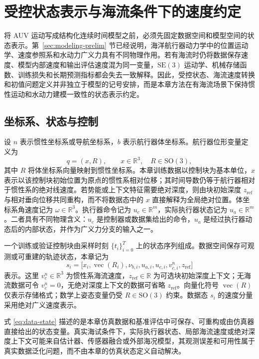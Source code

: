 \documentclass[UTF8,zihao=-4]{ctexrep}
\newcommand{\R}{\mathbb{R}}
\newcommand{\SO}{\mathrm{SO}}
\newcommand{\SE}{\mathrm{SE}}
\begin{document}
\section{受控状态表示与海流条件下的速度约定}
\label{sec:state-current-contract}

将 AUV 运动写成结构化连续时间模型之前，必须先固定数据空间和模型空间的状态表示。第~\ref{sec:modeling-prelim} 节已经说明，海洋航行器动力学中的位置运动学、速度参照系和水动力广义力具有不同物理作用。若有海流时仍将数据保存速度、模型内部速度和输出评估速度混为同一变量，\(\SE(3)\) 运动学、机械存储函数、训练损失和长期预测指标都会失去一致解释。因此，受控状态、海流速度转换和初值问题定义并非独立于模型的记号安排，而是本章方法在有海流场景下保持惯性运动和水动力建模一致性的状态表示约定。

\subsection{坐标系、状态与控制}

设 \(n\) 表示惯性坐标系或导航坐标系，\(b\) 表示航行器体坐标系。航行器位形变量定义为
\begin{equation}
  q=(x,R),\qquad x\in\R^3,\quad R\in\SO(3),
\end{equation}
其中 \(R\) 将体坐标系向量映射到惯性坐标系。本章训练数据以控制块为基本单位，\(x\) 表示以该控制块初始位置为原点的惯性系相对位移；其时间导数仍等于航行器相对于惯性系的绝对线速度。若势能或上下文特征需要绝对深度，则由块初始深度 \(z_{\mathrm{ref}}\) 与相对垂向位移共同重构，而不将数据态中的 \(x\) 直接解释为全局绝对位置。体坐标系角速度记为 \(\omega\in\R^3\)。执行器命令记为 \(u_c\in\R^m\)，实际执行器状态记为 \(u_a\in\R^m\)。二者具有不同物理含义：\(u_c\) 是控制器或数据集给出的命令，\(u_a\) 是经过执行器动态后的内部状态，并作为广义力分支的输入之一。

一个训练或验证控制块由采样时刻 \(\{t_i\}_{i=0}^{T}\) 上的状态序列组成。数据空间保存可观测或可重建的轨迹状态，本章记为
\begin{equation}
  s_i=
  \bigl[x_i,\operatorname{vec}(R_i),\nu_{b,i},u_{a,i},u_{c,i},v_{c,i}^n,z_{\mathrm{ref}}\bigr]
  \label{eq:data-state}
\end{equation}
表示。这里 \(v_c^n\in\R^3\) 为惯性系海流速度，\(z_{\mathrm{ref}}\in\R\) 为可选块初始深度上下文；无海流数据可令 \(v_c^n=0\)，无绝对深度上下文的数据可省略 \(z_{\mathrm{ref}}\)。向量化符号 \(\operatorname{vec}(R)\) 仅表示存储格式；数学上姿态变量仍受 \(R\in\SO(3)\) 约束。数据态 \(s_i\) 的速度分量采用绝对广义速度表示。

式 \eqref{eq:data-state} 描述的是本章仿真数据和基准评估中可保存、可重构或由仿真器直接给出的状态变量。真实海试条件下，实际执行器状态、局部海流速度或绝对深度上下文可能来自估计器、传感器融合或外部海况模型，其观测误差和可用性属于真实数据泛化问题，而不由本章的仿真状态定义自动解决。
\end{document}
